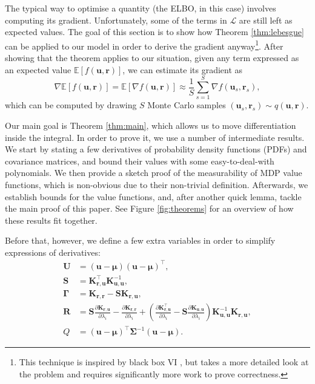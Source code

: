 \documentclass{mpaper}
\newcommand{\Kuu}{\mathbf{K}_{\mathbf{u},\mathbf{u}}}
\newcommand{\Krr}{\mathbf{K}_{\mathbf{r},\mathbf{r}}}
\newcommand{\Kru}{\mathbf{K}_{\mathbf{r},\mathbf{u}}}
\newcommand{\approximation}{q(\mathbf{u}, \mathbf{r})}
\begin{document}
The typical way to optimise a quantity (the ELBO, in this case) involves
computing its gradient. Unfortunately, some of the terms in $\mathcal{L}$ are
still left as expected values. The goal of this section is to show how Theorem
\ref{thm:lebesgue} can be applied to our model in order to derive the gradient
anyway\footnote{This technique is inspired by black box VI
  \cite{DBLP:conf/aistats/RanganathGB14}, but takes a more detailed look at the
  problem and requires significantly more work to prove correctness.}. After
showing that the theorem applies to our situation, given any term expressed as
an expected value $\mathbb{E}[f(\mathbf{u}, \mathbf{r})]$, we can estimate its
gradient as
\[
  \nabla\mathbb{E}[f(\mathbf{u}, \mathbf{r})] = \mathbb{E}[\nabla f(\mathbf{u},
  \mathbf{r})] \approx \frac{1}{S} \sum_{s=1}^S \nabla f(\mathbf{u}_s,
  \mathbf{r}_s),
\]
which can be computed by drawing $S$ Monte Carlo samples $(\mathbf{u}_s,
\mathbf{r}_s) \sim \approximation$.

Our main goal is Theorem \ref{thm:main}, which allows us to move differentiation
inside the integral. In order to prove it, we use a number of intermediate
results. We start by stating a few derivatives of probability density functions
(PDFs) and covariance matrices, and bound their values with some
easy-to-deal-with polynomials. We then provide a sketch proof of the
measurability of MDP value functions, which is non-obvious due to their
non-trivial definition. Afterwards, we establish bounds for the value functions,
and, after another quick lemma, tackle the main proof of this paper. See Figure
\ref{fig:theorems} for an overview of how these results fit together.

Before that, however, we define a few extra variables in order to simplify
expressions of derivatives:
\begin{align*}
  \mathbf{U} &= (\mathbf{u} - \bm\mu)(\mathbf{u} - \bm\mu)^\intercal, \\
  \mathbf{S} &= \Kru^\intercal\Kuu^{-1}, \\
  \bm\Gamma &= \Krr - \mathbf{S}\Kru, \\
  \mathbf{R} &= \mathbf{S}\frac{\partial \Kru}{\partial \lambda_i} - \frac{\partial \Krr}{\partial \lambda_i} + \left( \frac{\partial \Kru^\intercal}{\partial \lambda_i} - \mathbf{S}\frac{\partial \Kuu}{\partial \lambda_i} \right) \Kuu^{-1}\Kru, \\
  Q &= (\mathbf{u} - \bm\mu)^\intercal\bm\Sigma^{-1}(\mathbf{u} - \bm\mu).
\end{align*}
\end{document}
